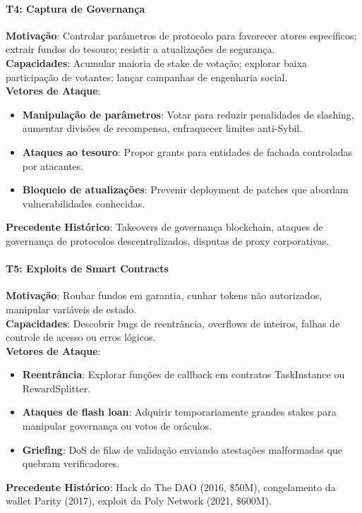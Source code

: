 \documentclass[11pt]{article}
\begin{document}
\begin{itemize}[noitemsep]
\begin{itemize}[noitemsep]
\begin{itemize}[noitemsep]
\paragraph{T4: Captura de Governança}
\textbf{Motivação}: Controlar parâmetros de protocolo para favorecer atores específicos; extrair fundos do tesouro; resistir a atualizações de segurança.\\
\textbf{Capacidades}: Acumular maioria de stake de votação; explorar baixa participação de votantes; lançar campanhas de engenharia social.\\
\textbf{Vetores de Ataque}:
\begin{itemize}[noitemsep]
  \item \textbf{Manipulação de parâmetros}: Votar para reduzir penalidades de slashing, aumentar divisões de recompensa, enfraquecer limites anti-Sybil.
  \item \textbf{Ataques ao tesouro}: Propor grants para entidades de fachada controladas por atacantes.
  \item \textbf{Bloqueio de atualizações}: Prevenir deployment de patches que abordam vulnerabilidades conhecidas.
\end{itemize}
\textbf{Precedente Histórico}: Takeovers de governança blockchain, ataques de governança de protocolos descentralizados, disputas de proxy corporativas.

\paragraph{T5: Exploits de Smart Contracts}
\textbf{Motivação}: Roubar fundos em garantia, cunhar tokens não autorizados, manipular variáveis de estado.\\
\textbf{Capacidades}: Descobrir bugs de reentrância, overflows de inteiros, falhas de controle de acesso ou erros lógicos.\\
\textbf{Vetores de Ataque}:
\begin{itemize}[noitemsep]
  \item \textbf{Reentrância}: Explorar funções de callback em contratos TaskInstance ou RewardSplitter.
  \item \textbf{Ataques de flash loan}: Adquirir temporariamente grandes stakes para manipular governança ou votos de oráculos.
  \item \textbf{Griefing}: DoS de filas de validação enviando atestações malformadas que quebram verificadores.
\end{itemize}
\textbf{Precedente Histórico}: Hack do The DAO (2016, \$50M), congelamento da wallet Parity (2017), exploit da Poly Network (2021, \$600M).


\end{itemize}
\end{itemize}
\end{itemize}
\end{document}

